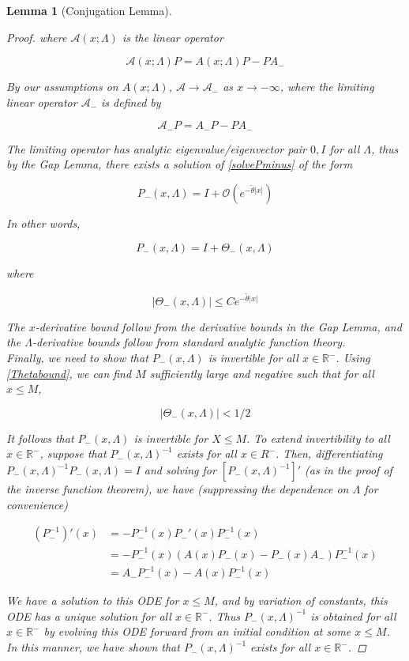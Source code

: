 \documentclass[12pt]{article}
\def\R{{\mathbb R}}
\newtheorem{lemma}{Lemma}
\begin{document}
\begin{lemma}[Conjugation Lemma]
\begin{proof}
where $\mathcal{A}(x; \Lambda)$ is the linear operator

\[
\mathcal{A}(x; \Lambda) P = A(x; \Lambda) P - P A_-
\]

By our assumptions on $A(x; \Lambda)$, $\mathcal{A} \rightarrow \mathcal{A}_-$ as $x \rightarrow -\infty$, where the limiting linear operator $\mathcal{A}_-$ is defined by

\[
\mathcal{A}_- P = A_- P - P A_-
\]

The limiting operator has analytic eigenvalue/eigenvector pair $0, I$ for all $\Lambda$, thus by the Gap Lemma, there exists a solution of \eqref{solvePminus} of the form 

\begin{equation}
P_-(x, \Lambda) = I + \mathcal{O}(e^{-\tilde{\theta}|x|})
\end{equation}

In other words, 

\begin{equation}
P_-(x, \Lambda) = I + \Theta_-(x, \Lambda)
\end{equation}

where 

\begin{equation}\label{Thetabound}
|\Theta_-(x, \Lambda)| \leq C e^{-\tilde{\theta}|x|}
\end{equation}

The $x$-derivative bound follow from the derivative bounds in the Gap Lemma, and the $\Lambda$-derivative bounds follow from standard analytic function theory.\\

Finally, we need to show that $P_-(x, \Lambda)$ is invertible for all $x \in \R^-$. Using \eqref{Thetabound}, we can find $M$ sufficiently large and negative such that for all $x \leq M$,

\[
|\Theta_-(x, \Lambda)| < 1/2
\]

It follows that $P_-(x, \Lambda)$ is invertible for $X \leq M$. To extend invertibility to all $x \in \R^-$, suppose that $P_-(x, \Lambda)^{-1}$ exists for all $x \in R^-$. Then, differentiating $P_-(x, \Lambda)^{-1} P_-(x, \Lambda) = I$ and solving for $[P_-(x, \Lambda)^{-1}]'$ (as in the proof of the inverse function theorem), we have (suppressing the dependence on $\Lambda$ for convenience)

\begin{align*}
(P_-^{-1})'(x) &= -P_-^{-1}(x)P_-'(x)P_-^{-1}(x) \\
&= -P_-^{-1}(x)( A(x)P_-(x) - P_-(x) A_-)P_-^{-1}(x) \\
&= A_- P_-^{-1}(x) - A(x) P_-^{-1}(x)
\end{align*}

We have a solution to this ODE for $x \leq M$, and by variation of constants, this ODE has a unique solution for all $x \in \R^-$. Thus $P_-(x, \Lambda)^{-1}$ is obtained for all $x \in \R^-$ by evolving this ODE forward from an initial condition at some $x \leq M$. In this manner, we have shown that $P_-(x, \Lambda)^{-1}$ exists for all $x \in \R^-$.

\end{proof}
\end{lemma}
\end{document}
